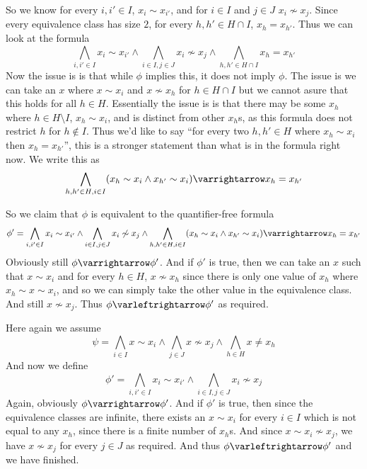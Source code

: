 \documentclass[10pt]{article}
\let\to=\varrightarrow
\let\oto=\varleftrightarrow
\begin{document}
            So we know for every $i,i'\in I$, $x_i\sim x_{i'}$, and for $i\in I$ and $j\in J$ $x_i\not\sim x_j$.
            Since every equivalence class has size $2$, for every $h,h'\in H\cap I$, $x_h=x_{h'}$.
            Thus we can look at the formula
            \[ \bigwedge_{i,i'\in I}x_i\sim x_{i'}\land\bigwedge_{i\in I,j\in J}x_i\not\sim x_j\land\bigwedge_{h,h'\in H\cap I}x_h=x_{h'} \]
            Now the issue is is that while $\phi$ implies this, it does not imply $\phi$.
            The issue is we can take an $x$ where $x\sim x_i$ and $x\not\sim x_h$ for $h\in H\cap I$ but we cannot asure that this holds for all $h\in H$.
            Essentially the issue is is that there may be some $x_h$ where $h\in H\setminus I$, $x_h\sim x_i$, and is distinct from other $x_h$s, as this formula does not restrict $h$ for $h\notin I$.
            Thus we'd like to say ``for every two $h,h'\in H$ where $x_h\sim x_i$ then $x_h=x_{h'}$'', this is a stronger statement than what is in the formula right now.
            We write this as
            \[ \bigwedge_{h,h'\in H, i\in I}(x_h\sim x_i\land x_{h'}\sim x_i)\to x_h=x_{h'} \]

            So we claim that $\phi$ is equivalent to the quantifier-free formula
            \[ \phi'=\bigwedge_{i,i'\in I}x_i\sim x_{i'}\land\bigwedge_{i\in I,j\in J}x_i\not\sim x_j\land\bigwedge_{h,h'\in H, i\in I}(x_h\sim x_i\land x_{h'}\sim x_i)\to x_h=x_{h'} \]
            Obviously still $\phi\to\phi'$.
            And if $\phi'$ is true, then we can take an $x$ such that $x\sim x_i$ and for every $h\in H$, $x\not\sim x_h$ since there is only one value of $x_h$ where $x_h\sim x\sim x_i$, and so we can
            simply take the other value in the equivalence class.
            And still $x\not\sim x_j$.
            Thus $\phi\oto\phi'$ as required.

        \item Here again we assume
            \[ \psi = \bigwedge_{i\in I}x\sim x_i\land\bigwedge_{j\in J}x\not\sim x_j\land\bigwedge_{h\in H}x\neq x_h \]
            And now we define
            \[ \phi' = \bigwedge_{i,i'\in I}x_i\sim x_{i'}\land\bigwedge_{i\in I,j\in J}x_i\not\sim x_j \]
            Again, obviously $\phi\to\phi'$.
            And if $\phi'$ is true, then since the equivalence classes are infinite, there exists an $x\sim x_i$ for every $i\in I$ which is not equal to any $x_h$, since there is a finite number of $x_h$s.
            And since $x\sim x_i\not\sim x_j$, we have $x\not\sim x_j$ for every $j\in J$ as required.
            And thus $\phi\oto\phi'$ and we have finished.
\end{document}
